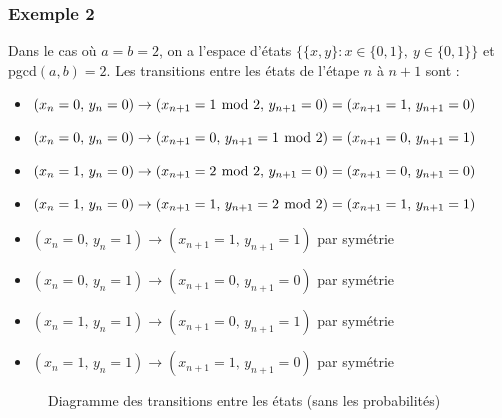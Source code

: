 \documentclass{article}
\begin{document}
\subsubsection*{Exemple 2}
Dans le cas où $a=b=2$, on a l'espace d'états $\{\{x,y\}:x\in\{0,1\},\ y\in\{0,1\}\}$
et pgcd$(a,b)=2$. Les transitions entre les états de l'étape $n$ à $n+1$ sont :
\begin{itemize}
    \item $(x_n=0,\,y_n=0)\to(x_{n+1}=1\hspace{-.1cm}\mod 2,\,y_{n+1}=0)=(x_{n+1}=1,\,y_{n+1}=0)$
    \item $(x_n=0,\,y_n=0)\to(x_{n+1}=0,\,y_{n+1}=1\hspace{-.1cm}\mod 2)=(x_{n+1}=0,\,y_{n+1}=1)$
    \item $(x_n=1,\,y_n=0)\to(x_{n+1}=2\hspace{-.1cm}\mod 2,\,y_{n+1}=0)=(x_{n+1}=0,\,y_{n+1}=0)$
    \item $(x_n=1,\,y_n=0)\to(x_{n+1}=1,\,y_{n+1}=2\hspace{-.1cm}\mod 2)=(x_{n+1}=1,\,y_{n+1}=1)$
    \item $(x_n=0,\,y_n=1)\to(x_{n+1}=1,\,y_{n+1}=1)$ par symétrie
    \item $(x_n=0,\,y_n=1)\to(x_{n+1}=0,\,y_{n+1}=0)$ par symétrie
    \item $(x_n=1,\,y_n=1)\to(x_{n+1}=0,\,y_{n+1}=1)$ par symétrie
    \item $(x_n=1,\,y_n=1)\to(x_{n+1}=1,\,y_{n+1}=0)$ par symétrie
\end{itemize}
\begin{figure}[h]
    \centering
    \caption{Diagramme des transitions entre les états (sans les probabilités)}
\end{figure}
\end{document}
